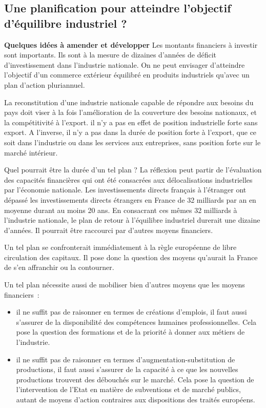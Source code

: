 \documentclass[a4paper]{article}
\begin{document}
\subsection{Une planification pour atteindre l’objectif d’équilibre industriel ?}

\textbf{Quelques idées à amender et développer}
Les montants financiers à investir sont importants. Ils sont à la mesure de dizaines d’années de déficit d’investissement dans l’industrie nationale. On ne peut envisager d’atteindre l’objectif d’un commerce extérieur équilibré en produits industriels qu’avec un plan d’action pluriannuel. 

La reconstitution d’une industrie nationale capable de répondre aux besoins du pays doit viser à la fois l’amélioration de la couverture des besoins nationaux, et la compétitivité à l’export. il n'y a pas en effet de position industrielle forte sans export. A l’inverse, il n'y a pas dans la durée de position forte à l'export, que ce soit dans l'industrie ou dans les services aux entreprises, sans position forte sur le marché intérieur.

Quel pourrait être la durée d’un tel plan ? La réflexion peut partir de l’évaluation des capacités financières qui ont été consacrées aux délocalisations industrielles par l’économie nationale. Les investissements directs français à l’étranger ont dépassé les investissements directs étrangers en France de 32 milliards par an en moyenne durant au moins 20 ans. En consacrant ces mêmes 32 milliards à l’industrie nationale, le plan de retour à l’équilibre industriel durerait une dizaine d’années. Il pourrait être raccourci par d’autres moyens financiers.

Un tel plan se confronterait immédiatement à la règle européenne de libre circulation des capitaux. Il pose donc la question des moyens qu’aurait la France de s’en affranchir ou la contourner.

Un tel plan nécessite aussi de mobiliser bien d’autres moyens que les moyens financiers~:
\begin{itemize}
\item il ne suffit pas de raisonner en termes de créations d’emplois, il faut aussi s’assurer de la disponibilité des compétences humaines professionnelles. Cela pose la question des formations et de la priorité à donner aux métiers de l’industrie. 
\item il ne suffit pas de raisonner en termes d’augmentation-substitution de productions, il faut aussi s’assurer de la capacité à ce que les nouvelles productions trouvent des débouchés sur le marché. Cela pose la question de l’intervention de l’Etat en matière de subventions et de marché publics, autant de moyens d’action contraires aux dispositions des traités européens.
\end{itemize}
\end{document}
